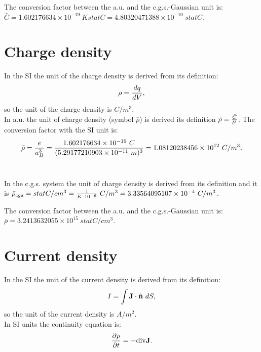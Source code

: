 \documentclass[12pt,a4paper]{article}
\def\barl{5.29177210903\times 10^{-11}}
\def\barc{1.602176634\times 10^{-19}}
\def\barrho{1.08120238456\times 10^{12}}
\def\rhotorho{3.33564095107\times 10^{-4}}
\def\barccgs{4.80320471388\times 10^{-10}}
\def\barrhocgs{3.2413632055\times 10^{15}}
\begin{document}

{\color{green} The conversion factor between the a.u. and the 
c.g.s.-Gaussian unit is: $\bar C=\barc\ K statC=\barccgs\ statC$. \\
}

\newpage
\section{\color{coral}Charge density}
In the SI the unit of the charge density is derived from its
definition:
\begin{equation}
\rho={dq \over dV},
\end{equation}
so the unit of the charge density is $C/m^3$.
\\

{\color{web-blue} In a.u. the unit of charge density (symbol $\bar \rho$) 
is derived its definition $\bar \rho ={\bar C \over \bar l^3}$. The
conversion factor with the SI unit is: 
\begin{equation}
\bar \rho = {e\over a_B^3} =
{\barc\ C\over (\barl\ m)^3}=\barrho\ C/m^3. 
\end{equation}
\\
}

{\color{orange} In the c.g.s. system the unit of charge density  
is derived from its definition and it is
$\bar \rho_{cgs}=statC/cm^3 = {1 \over K\ 10^{-6}}\ C/m^3=\rhotorho\ C/m^3$.
\\
}

{\color{green} The conversion factor between the a.u. and the 
c.g.s.-Gaussian unit is: $\bar \rho = \barrhocgs\ statC/cm^3$. 
\\
}

\newpage
\section{\color{coral}Current density}
In the SI the unit of the current density is derived from 
its definition:
\begin{equation}
I=\int {\bf J}\cdot \hat {\bf n}\ dS,
\end{equation}
so the unit of the current density is $A/m^2$.
\\
In SI units the continuity equation is:
\begin{equation}
{\partial \rho \over \partial t}=-{\rm div} {\bf J}.
\label{continuitysi}
\end{equation}
\\
\end{document}
